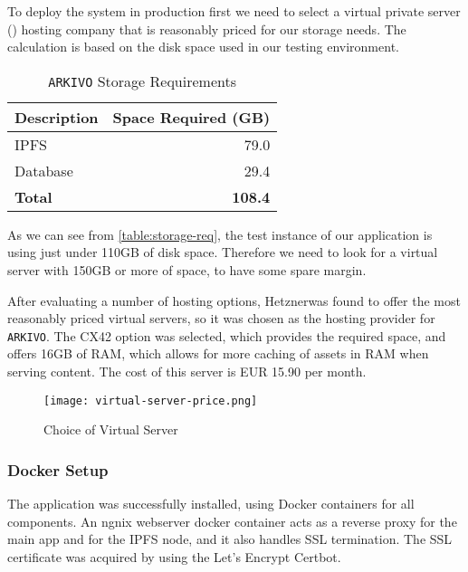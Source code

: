 To deploy the system in production first we need to select a virtual private server () hosting company that is reasonably priced for our storage needs. The calculation is based on the disk space used in our testing environment.

\begin{table}[h]
\footnotesize
\centering
\begin{tabular}{|l|r|}
\hline
\textbf{Description} & \textbf{Space Required (GB)} \\ \hline
IPFS                 & 79.0                         \\ \hline
Database             & 29.4                         \\ \hline
\textbf{Total}       & \textbf{108.4}               \\ \hline
\end{tabular}
\caption{\texttt{ARKIVO} Storage Requirements}
\label{table:storage-req}
\end{table}


As we can see from \autoref{table:storage-req}, the test instance of our application is using just under 110GB of disk space. Therefore we need to look for a virtual server with 150GB or more of space, to have some spare margin.

After evaluating a number of hosting options, Hetzner\footnotemark[9] was found to offer the most reasonably priced virtual servers, so it was chosen as the hosting provider for \texttt{ARKIVO}.
The CX42 option was selected, which provides the required space, and offers 16GB of RAM, which allows for more caching of assets in RAM when serving content. The cost of this server is EUR 15.90 per month.


\begin{figure}[H]
    \centering
    \texttt{[image: virtual-server-price.png]}
    \caption[Choice of Virtual Server]{Choice of Virtual Server}
    \label{fig:vps-choice}
\end{figure}


\subsubsection{Docker Setup}

The application was successfully installed, using Docker containers for all components. An ngnix webserver docker container acts as a reverse proxy for the main app and for the IPFS node, and it also handles SSL termination. The SSL certificate was acquired by using the Let's Encrypt Certbot.

